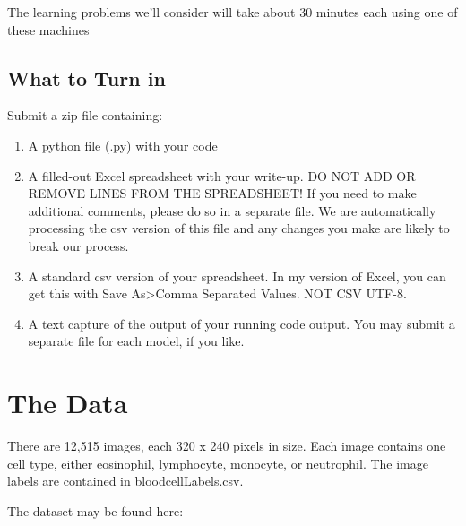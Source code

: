 \documentclass[11pt]{article}
\renewcommand\:{\colon} %
\begin{document}
The learning problems we'll consider will take about 30 minutes each using one of these machines


%
%
%

\subsection*{What to Turn in}

Submit a zip file containing:
\begin{enumerate}
\item A python file (.py) with your code
\item A filled-out Excel spreadsheet with your write-up.  DO NOT ADD OR REMOVE LINES FROM THE SPREADSHEET!  If you need to make additional comments, please do so in a separate file. We are automatically processing the csv version of this file and any changes you make are likely to break our process.
\item A standard csv version of your spreadsheet. In my version of Excel, you can get this with Save As>Comma Separated Values. NOT CSV UTF-8.
\item A text capture of the output of your running code output. You may submit a separate file for each model, if you like.
\end{enumerate}

\section*{The Data}
There are 12,515 images, each 320 x 240 pixels in size. Each image contains one cell type, either  eosinophil, lymphocyte, monocyte, or neutrophil.  The image labels are contained in bloodcellLabels.csv.

The dataset may be found here:
\end{document}
